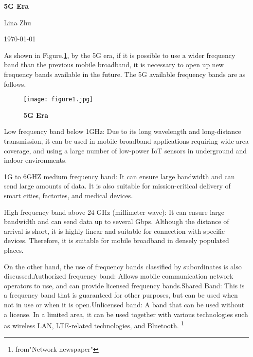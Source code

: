 \documentclass[a4paper,12pt,twocolumn]{article}
\begin{document}
	\begin{center}
		
		{\bfseries \LARGE 5G Era} 
	\end{center}
	\begin{center}
		Lina Zhu
	\end{center}
	\begin{center}
		\today
	\end{center}
	\par As shown in Figure.\ref{pic1}, by the 5G era, if it is possible to use a wider frequency band than the previous mobile broadband, it is necessary to open up new frequency bands available in the future. The 5G available frequency bands are as follows.
		\begin{figure}[htp]
		\centering
		\texttt{[image: figure1.jpg]}
		\caption{\bfseries{5G Era}}\label{pic1}
	\end{figure}
	\par Low frequency band below 1GHz: Due to its long wavelength and long-distance transmission, it can be used in mobile broadband applications requiring wide-area coverage, and using a large number of low-power IoT sensors in underground and indoor environments.
	\par 1G to 6GHZ medium frequency band: It can ensure large bandwidth and can send large amounts of data. It is also suitable for mission-critical delivery of smart cities, factories, and medical devices.
\par 	High frequency band above 24 GHz (millimeter wave): It can ensure large bandwidth and can send data up to several Gbps. Although the distance of arrival is short, it is highly linear and suitable for connection with specific devices. Therefore, it is suitable for mobile broadband in densely populated places.
\par	On the other hand, the use of frequency bands classified by subordinates is also discussed.Authorized frequency band: Allows mobile communication network operators to use, and can provide licensed frequency bands.Shared Band: This is a frequency band that is guaranteed for other purposes, but can be used when not in use or when it is open.Unlicensed band: A band that can be used without a license. In a limited area, it can be used together with various technologies such as wireless LAN, LTE-related technologies, and Bluetooth.
\footnote{from"Network newspaper"} 


	
\end{document}
